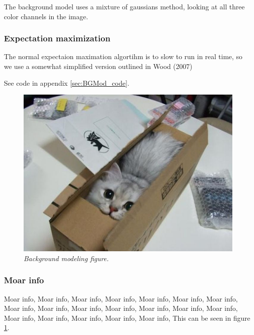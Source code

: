 The background model uses a mixture of gaussians method, looking at all three color channels in the image.

\subsubsection{Expectation maximization}
The normal expectaion maximation algortihm is to slow to run in real time, so we use a somewhat simplified version outlined in Wood (2007)

See code in appendix \ref{sec:BGMod_code}. %

\begin{figure}[htb]
	\centering
	\includegraphics[width=\linewidth]{images/acatisfinetoo}
	\caption{\textit{Background modeling figure.}}
	\label{fig:BGModeling_fig} %
\end{figure}

\subsubsection{Moar info}
Moar info, Moar info, Moar info, Moar info, Moar info, Moar info, Moar info, Moar info, Moar info, Moar info, Moar info, Moar info, Moar info, Moar info, Moar info, Moar info, Moar info, Moar info, Moar info, 
This can be seen in figure \ref{fig:BGModeling_fig}. %
